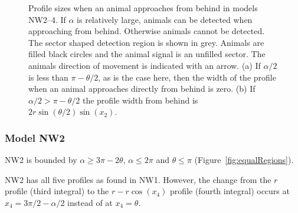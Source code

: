 \begin{figure}[t]
  \centering
{
}
\caption[Profile sizes for an animal approaching from behind: models NW2--4]{
Profile sizes when an animal approaches from behind in models NW2--4.
If $\alpha$ is relatively large, animals can be detected when approaching from behind.
Otherwise animals cannot be detected.
The sector shaped detection region is shown in grey.
Animals are filled black circles and the animal signal is an unfilled sector.
The animals direction of movement is indicated with an arrow.
(a) If $\alpha/2$ is less than $\pi - \theta/2$, as is the case here, then the width of the profile when an animal approaches directly from behind is zero.
(b) If $\alpha/2 > \pi - \theta/2$ the profile width from behind is $2r\sin\left(\theta/2\right)\sin(x_2)$.
}
\label{fig:NW2--4}
\end{figure}


\subsubsection{Model NW2} \label{NW2}

NW2 is bounded by $\alpha \ge 3\pi - 2\theta$, $\alpha \le 2\pi$ and $\theta\le\pi$ (Figure~\ref{fig:equalRegions}).

NW2 has all five profiles as found in NW1.
However, the change from the $r$ profile (third integral) to the $r - r\cos(x_4)$ profile (fourth integral) occurs at $x_4 = 3\pi/2 - \alpha/2$ instead of at $x_4 = \theta$.

